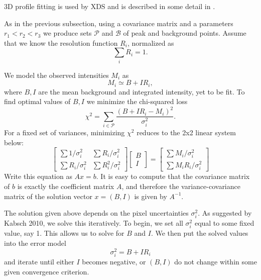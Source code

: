\documentclass[twocolumn,preprintnumbers,amsmath,amssymb]{revtex4}
\newcommand{\calP}{\mathcal{P}}
\newcommand{\calB}{\mathcal{B}}
\begin{document}
3D profile fitting is used by XDS \cite{xds-2010} and is described in some detail in \cite{kabsch-1988, kabsch-2010}.

As in the previous subsection, using a covariance matrix and a parameters $r_1 < r_2 < r_3$ we produce sets $\calP$ and $\calB$ of peak and background points.
Assume that we know the resolution function $R_i$,
normalized as
\begin{equation}\label{Eresnor}
  \sum_i R_i = 1.
\end{equation}

We model the observed intensities $M_i$ as
\begin{equation} M_i \simeq B + I R_i, \end{equation}
where $B, I$ are the mean background and integrated intensity, yet to be fit. To find optimal values of $B,I$ we minimize the chi-squared loss
\begin{equation} \chi^2 = \sum_{i \in \calP} \frac{(B+IR_i - M_i)^2}{\sigma^2_i}. \end{equation}
For a fixed set of variances, minimizing $\chi^2$ reduces to the 2x2 linear system below:
\begin{equation} \begin{bmatrix}
  \sum 1/\sigma^2_i & \sum R_i / \sigma^2_i \\
  \sum R_i/\sigma_i^2 & \sum R_i^2 / \sigma^2_i
\end{bmatrix}
\begin{bmatrix} B \\ I \end{bmatrix}
 = \begin{bmatrix} \sum M_i/\sigma^2_i \\ \sum M_i R_i / \sigma^2_i \end{bmatrix} \end{equation}
 Write this equation as $Ax = b$. It is easy to compute that the covariance matrix of $b$ is exactly the coefficient matrix
 $A$, and therefore the variance-covariance matrix of the solution vector $x = (B, I)$ is given by $A^{-1}$.

The solution given above depends on the pixel uncertainties $\sigma_i^2$. As suggested by Kabsch 2010, we solve this iteratively. To begin, we set all $\sigma^2_i$ equal to some fixed value, say 1. This allows us to solve for $B$ and $I$. We then put the solved values into the error model
\begin{equation} \sigma_i^2 = B + I R_i \end{equation}
and iterate until either $I$ becomes negative, or $(B, I)$ do not change within some given convergence criterion.
\end{document}
